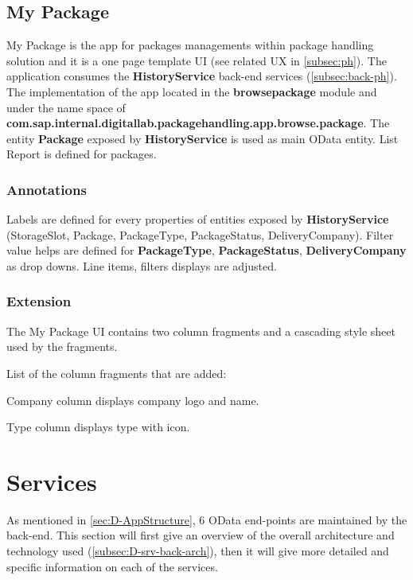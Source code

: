 \subsection{My Package}
\label{subsec:dev-ui-ph}

My Package is the app for packages managements within package handling solution and it is a one page template UI (see related UX in \autoref{subsec:ph}).
The application consumes the \textbf{HistoryService} back-end services (\autoref{subsec:back-ph}).
The implementation of the app
located in the \textbf{browsepackage} module and under the name space of
\textbf{com.sap.internal.digitallab.packagehandling.app.browse.package}.
The entity \textbf{Package} exposed by  \textbf{HistoryService} is used as main OData entity.
List Report is defined for packages.

\subsubsection{Annotations}
Labels are defined for every properties of entities exposed by \textbf{HistoryService} (StorageSlot, Package, PackageType, PackageStatus, DeliveryCompany). 
Filter value helps are defined for \textbf{PackageType}, \textbf{PackageStatus}, \textbf{DeliveryCompany} as drop downs.
Line items, filters displays are adjusted.

\subsubsection{Extension}

The My Package UI contains two column fragments and a cascading style sheet used by the fragments.

\bigskip
\noindent
List of the column fragments that are added:
\begin{compactenum}
    \item Company column displays company logo and name.
    \item Type column displays type with icon.
\end{compactenum}



\section{Services}
\label{sec:D-srv}

As mentioned in \autoref{sec:D-AppStructure}, 6 OData end-points are maintained by the back-end. This section will first give an overview of the overall architecture and technology used (\autoref{subsec:D-srv-back-arch}), then it will give more detailed and specific information on each of the services.

